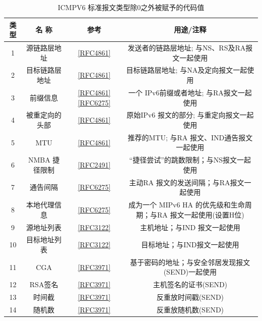\begin{table}[]
    \centering
    \caption{ICMPV6 标准报文类型除0之外被赋予的代码值}
    \begin{tabular}{c|c|c|c}
        \hline
		类型	&	名 称	&	参考	&	用途/注释     \\ \hline
		1	&	源链路层地址	&	\href{https://www.rfc-editor.org/rfc/rfc4861}{[RFC4861]}	&	发送者的链路层地址; 与NS、RS及RA报文一起使用  \\ \hline
		2	&	目标链路层地址	&	\href{https://www.rfc-editor.org/rfc/rfc4861}{[RFC4861]}	&	目标链路层地址; 与NA及定向报文一起使用  \\ \hline
		3	&	前缀信息	&	\href{https://www.rfc-editor.org/rfc/rfc4861}{[RFC4861]}\href{https://www.rfc-editor.org/rfc/rfc6275}{[RFC6275]}	&一个 IPv6前缀或者地址; 与RA报文一起使用  \\ \hline
		4	&	被重定向的头部	&	\href{https://www.rfc-editor.org/rfc/rfc4861}{[RFC4861]}	&	原始IPv6 报文的部分; 与重定向报文一起使用  \\ \hline
		5	&	MTU	&	\href{https://www.rfc-editor.org/rfc/rfc4861}{[RFC4861]}	&	推荐的MTU; 与RA 报文、IND通告报文一起使用  \\ \hline
		6	&	NMBA 捷径限制	&	\href{https://www.rfc-editor.org/rfc/rfc2491}{[RFC2491]}	&	“捷径尝试”的跳数限制；与NS报文一起使用 \\ \hline
		7	&	通告间隔	&	\href{https://www.rfc-editor.org/rfc/rfc6275}{[RFC6275]}	&	主动RA 报文的发送间隔；与RA报文一起使用 \\ \hline
		8	&	本地代理信息	&	\href{https://www.rfc-editor.org/rfc/rfc6275}{[RFC6275]}	&	成为一个 MIPv6 HA 的优先级和生命周期；与RA 报文一起使用(设置H位) \\ \hline
		9	&	源地址列表	&	\href{https://www.rfc-editor.org/rfc/rfc3122}{[RFC3122]}	&	主机地址；与IND 报文一起使用 \\ \hline
		10	&	目标地址列表	&	\href{https://www.rfc-editor.org/rfc/rfc3122}{[RFC3122]}	&	目标地址；与IND报文一起使用 \\ \hline
		11	&	CGA	&	\href{https://www.rfc-editor.org/rfc/rfc3971}{[RFC3971]}	&	基于密码的地址；与安全邻居发现报文(SEND)一起使用 \\ \hline
		12	&	RSA签名	&	\href{https://www.rfc-editor.org/rfc/rfc3971}{[RFC3971]}	&	主机签名的证书(SEND) \\ \hline
		13	&	时间截	&	\href{https://www.rfc-editor.org/rfc/rfc3971}{[RFC3971]}	&	反重放时间戳(SEND) \\ \hline
		14	&	随机数	&	\href{https://www.rfc-editor.org/rfc/rfc3971}{[RFC3971]}	&	反重放随机数(SEND) \\ \hline

\end{tabular}
\end{table}
